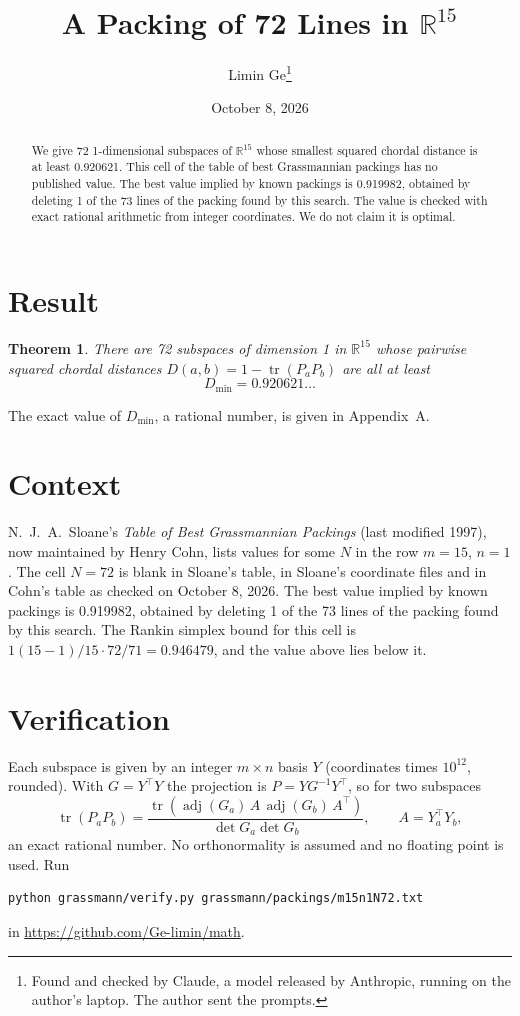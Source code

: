 \documentclass[11pt,a4paper]{article}
\title{A Packing of 72 Lines in $\mathbb{R}^{15}$}
\author{Limin Ge\thanks{Found and checked by Claude, a model released by Anthropic, running on the author's laptop. The author sent the prompts.}}
\date{October 8, 2026}
\newtheorem*{theorem}{Theorem}
\begin{document}
\maketitle
\begin{abstract}
We give 72 1-dimensional subspaces of $\mathbb{R}^{15}$ whose smallest squared chordal distance is at least 0.920621. This cell of the table of best Grassmannian packings has no published value. The best value implied by known packings is 0.919982, obtained by deleting 1 of the 73 lines of the packing found by this search. The value is checked with exact rational arithmetic from integer coordinates. We do not claim it is optimal.
\end{abstract}

\section{Result}
\begin{theorem}
There are 72 subspaces of dimension 1 in $\mathbb{R}^{15}$ whose pairwise squared chordal distances $D(a,b) = 1 - \operatorname{tr}(P_aP_b)$ are all at least
\[ D_{\min} = 0.920621\ldots \]
\end{theorem}
The exact value of $D_{\min}$, a rational number, is given in Appendix~A.


\section{Context}
N.~J.~A.~Sloane's \emph{Table of Best Grassmannian Packings} (last modified 1997), now maintained by Henry Cohn, lists values for some $N$ in the row $m=15$, $n=1$. The cell $N=72$ is blank in Sloane's table, in Sloane's coordinate files and in Cohn's table as checked on October 8, 2026. The best value implied by known packings is 0.919982, obtained by deleting 1 of the 73 lines of the packing found by this search. The Rankin simplex bound for this cell is $1(15-1)/15\cdot 72/71 = 0.946479$, and the value above lies below it.


\section{Verification}
Each subspace is given by an integer $m\times n$ basis $Y$ (coordinates times $10^{12}$, rounded). With $G=Y^\top Y$ the projection is $P=YG^{-1}Y^\top$, so for two subspaces
\[ \operatorname{tr}(P_aP_b)=\frac{\operatorname{tr}(\operatorname{adj}(G_a)\,A\,\operatorname{adj}(G_b)\,A^\top)}{\det G_a\det G_b},\qquad A=Y_a^\top Y_b, \]
an exact rational number. No orthonormality is assumed and no floating point is used. Run
\begin{verbatim}
python grassmann/verify.py grassmann/packings/m15n1N72.txt
\end{verbatim}
in \url{https://github.com/Ge-limin/math}.
\end{document}
